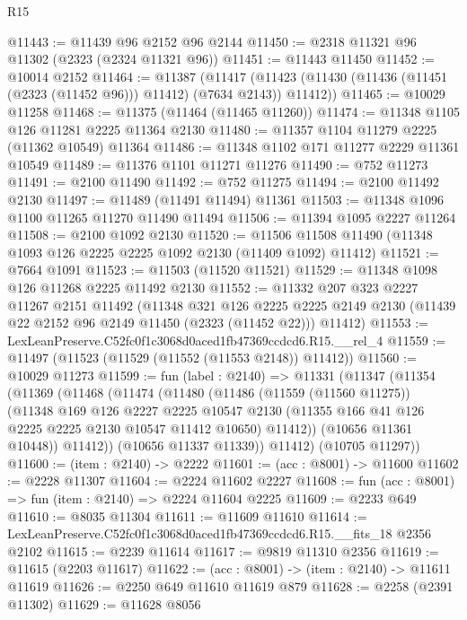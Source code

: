 \begin{lexlean}{R15}
\begin{coremodule}
@11443 := @11439 @96 @2152 @96 @2144
@11450 := @2318 @11321 @96 @11302 (@2323 (@2324 @11321 @96))
@11451 := @11443 @11450
@11452 := @10014 @2152
@11464 := @11387
    (@11417 (@11423 (@11430 (@11436 (@11451 (@2323 (@11452 @96))) @11412) (@7634 @2143)) @11412))
@11465 := @10029 @11258
@11468 := @11375 (@11464 (@11465 @11260))
@11474 := @11348 @1105 @126 @11281 @2225 @11364 @2130
@11480 := @11357 @1104 @11279 @2225 (@11362 @10549) @11364
@11486 := @11348 @1102 @171 @11277 @2229 @11361 @10549
@11489 := @11376 @1101 @11271 @11276
@11490 := @752 @11273
@11491 := @2100 @11490
@11492 := @752 @11275
@11494 := @2100 @11492 @2130
@11497 := @11489 (@11491 @11494) @11361
@11503 := @11348 @1096 @1100 @11265 @11270 @11490 @11494
@11506 := @11394 @1095 @2227 @11264
@11508 := @2100 @1092 @2130
@11520 := @11506 @11508 @11490 (@11348 @1093 @126 @2225 @2225 @1092 @2130 (@11409 @1092) @11412)
@11521 := @7664 @1091
@11523 := @11503 (@11520 @11521)
@11529 := @11348 @1098 @126 @11268 @2225 @11492 @2130
@11552 := @11332
    @207
    @323
    @2227
    @11267
    @2151
    @11492
    (@11348
      @321
      @126
      @2225
      @2225
      @2149
      @2130
      (@11439 @22 @2152 @96 @2149 @11450 (@2323 (@11452 @22)))
      @11412)
@11553 := LexLeanPreserve.C52fc0f1c3068d0aced1fb47369ccdcd6.R15.__rel_4
@11559 := @11497 (@11523 (@11529 (@11552 (@11553 @2148)) @11412))
@11560 := @10029 @11273
@11599 := fun (label : @2140) =>
  @11331
    (@11347
      (@11354
        (@11369
          (@11468
            (@11474
              (@11480
                (@11486
                  (@11559 (@11560 @11275))
                  (@11348
                    @169
                    @126
                    @2227
                    @2225
                    @10547
                    @2130
                    (@11355 @166 @41 @126 @2225 @2225 @2130 @10547 @11412 @10650)
                    @11412))
                (@10656 @11361 @10448))
              @11412))
          (@10656 @11337 @11339))
        @11412)
      (@10705 @11297))
@11600 := (item : @2140) -> @2222
@11601 := (acc : @8001) -> @11600
@11602 := @2228 @11307
@11604 := @2224 @11602 @2227
@11608 := fun (acc : @8001) => fun (item : @2140) => @2224 @11604 @2225
@11609 := @2233 @649
@11610 := @8035 @11304
@11611 := @11609 @11610
@11614 := LexLeanPreserve.C52fc0f1c3068d0aced1fb47369ccdcd6.R15.__fits_18 @2356 @2102
@11615 := @2239 @11614
@11617 := @9819 @11310 @2356
@11619 := @11615 (@2203 @11617)
@11622 := (acc : @8001) -> (item : @2140) -> @11611 @11619
@11626 := @2250 @649 @11610 @11619 @879
@11628 := @2258 (@2391 @11302)
@11629 := @11628 @8056

\end{coremodule}
\end{lexlean}
